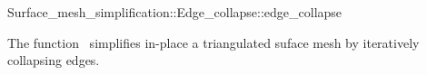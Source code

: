 

\begin{ccRefFunction}{Surface_mesh_simplification::Edge_collapse::edge_collapse}


\ccDefinition

The function \ccRefName\ simplifies in-place a triangulated suface mesh by iteratively collapsing edges.



\end{ccRefFunction}
